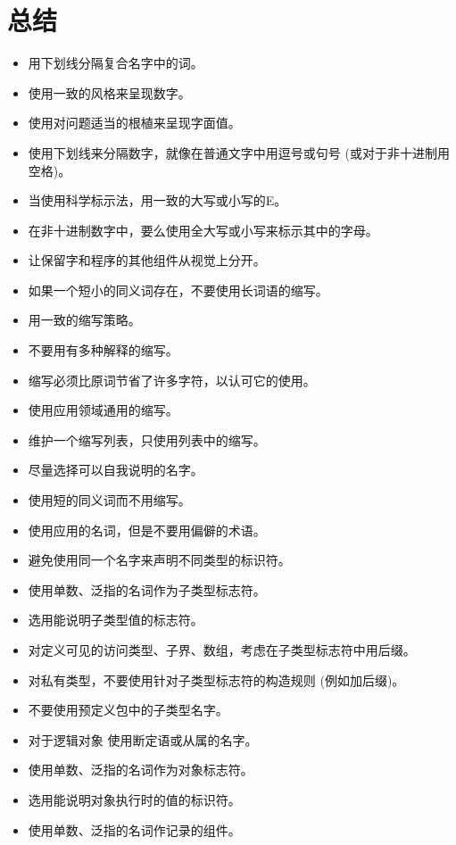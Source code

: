 \section{总结}
\noindent
\begin{itemize}
    \item 用下划线分隔复合名字中的词。
    \item 使用一致的风格来呈现数字。
    \item 使用对问题适当的根植来呈现字面值。
    \item 使用下划线来分隔数字，就像在普通文字中用逗号或句号
(或对于非十进制用空格)。
    \item 当使用科学标示法，用一致的大写或小写的E。
    \item 在非十进制数字中，要么使用全大写或小写来标示其中的字母。
    \item 让保留字和程序的其他组件从视觉上分开。
    \item 如果一个短小的同义词存在，不要使用长词语的缩写。
    \item 用一致的缩写策略。
    \item 不要用有多种解释的缩写。
    \item 缩写必须比原词节省了许多字符，以认可它的使用。
    \item 使用应用领域通用的缩写。
    \item 维护一个缩写列表，只使用列表中的缩写。
\end{itemize}

\noindent
\begin{itemize}
    \item 尽量选择可以自我说明的名字。
    \item 使用短的同义词而不用缩写。
    \item 使用应用的名词，但是不要用偏僻的术语。
    \item 避免使用同一个名字来声明不同类型的标识符。
    \item 使用单数、泛指的名词作为子类型标志符。
    \item 选用能说明子类型值的标志符。
    \item 对定义可见的访问类型、子界、数组，考虑在子类型标志符中用后缀。
    \item 对私有类型，不要使用针对子类型标志符的构造规则 (例如加后缀)。
    \item 不要使用预定义包中的子类型名字。
    \item 对于逻辑对象 使用断定语或从属的名字。
    \item 使用单数、泛指的名词作为对象标志符。
    \item 选用能说明对象执行时的值的标识符。
    \item 使用单数、泛指的名词作记录的组件。
\end{itemize}

